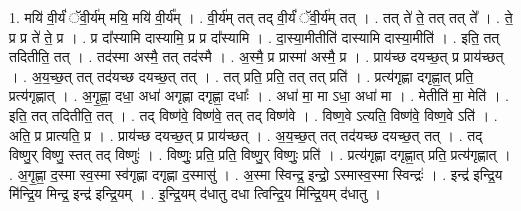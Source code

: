 \documentclass[17pt]{extarticle}
\begin{document}
1. मयि॑ वी॒र्यं॑ ॅवी॒र्य॑म् मयि॒ मयि॑ वी॒र्य᳚म् । . वी॒र्य॑म् तत् तद् वी॒र्यं॑ ॅवी॒र्य॑म् तत् । . तत् ते॑ ते॒ तत् तत् ते᳚ । . ते॒ प्र प्र ते॑ ते॒ प्र । . प्र दा᳚स्यामि दास्यामि॒ प्र प्र दा᳚स्यामि । . दा॒स्या॒मीतीति॑ दास्यामि दास्या॒मीति॑ । . इति॒ तत् तदितीति॒ तत् । . तद॑स्मा अस्मै॒ तत् तद॑स्मै । . अ॒स्मै॒ प्र प्रास्मा॑ अस्मै॒ प्र । . प्राय॑च्छ दयच्छ॒त् प्र प्राय॑च्छत् । . अ॒य॒च्छ॒त् तत् तद॑यच्छ दयच्छ॒त् तत् । . तत् प्रति॒ प्रति॒ तत् तत् प्रति॑ । . प्रत्य॑गृह्णा दगृह्णा॒त् प्रति॒ प्रत्य॑गृह्णात् । . अ॒गृ॒ह्णा॒ दधा॒ अधा॑ अगृह्णा दगृह्णा॒ दधाः᳚ । . अधा॑ मा॒ मा ऽधा॒ अधा॑ मा । . मेतीति॑ मा॒ मेति॑ । . इति॒ तत् तदितीति॒ तत् । . तद् विष्ण॑वे॒ विष्ण॑वे॒ तत् तद् विष्ण॑वे । . विष्ण॒वे ऽत्यति॒ विष्ण॑वे॒ विष्ण॒वे ऽति॑ । . अति॒ प्र प्रात्यति॒ प्र । . प्राय॑च्छ दयच्छ॒त् प्र प्राय॑च्छत् । . अ॒य॒च्छ॒त् तत् तद॑यच्छ दयच्छ॒त् तत् । . तद् विष्णु॒र् विष्णु॒ स्तत् तद् विष्णुः॑ । . विष्णुः॒ प्रति॒ प्रति॒ विष्णु॒र् विष्णुः॒ प्रति॑ । . प्रत्य॑गृह्णा दगृह्णा॒त् प्रति॒ प्रत्य॑गृह्णात् । . अ॒गृ॒ह्णा॒ द॒स्मा स्व॒स्मा स्व॑गृह्णा दगृह्णा द॒स्मासु॑ । . अ॒स्मा स्विन्द्र॒ इन्द्रो॒ ऽस्मास्व॒स्मा स्विन्द्रः॑ । . इन्द्र॑ इन्द्रि॒य मि॑न्द्रि॒य मिन्द्र॒ इन्द्र॑ इन्द्रि॒यम् । . इ॒न्द्रि॒यम् द॑धातु दधा त्विन्द्रि॒य मि॑न्द्रि॒यम् द॑धातु । \newline
\end{document}
